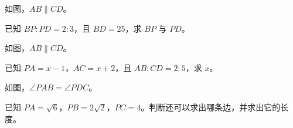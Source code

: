 \documentclass{exam-zh}
\begin{document}

\begin{problem}[points=10]
  \noindent
  \begin{minipage}[t]{\dimexpr\linewidth-60mm-6mm\relax}
    \vspace{0pt}
    如图，$AB\parallel CD$。

已知 $BP:PD=2:3$，且 $BD=25$，求 $BP$ 与 $PD$。
    
  \end{minipage}\hfill
  \begin{diagramcoltikz}{60mm}{}
  }
  \end{diagramcoltikz}
  \par\medskip
  \answerarea[48mm]
\end{problem}



\begin{problem}[points=10]
  \noindent
  \begin{minipage}[t]{\dimexpr\linewidth-60mm-6mm\relax}
    \vspace{0pt}
    如图，$AB\parallel CD$。

已知 $PA=x-1$，$AC=x+2$，且 $AB:CD=2:5$，求 $x$。
    
  \end{minipage}\hfill
  \begin{diagramcoltikz}{60mm}{}
  }
  \end{diagramcoltikz}
  \par\medskip
  \answerarea[48mm]
\end{problem}



\begin{problem}[points=10]
  \noindent
  \begin{minipage}[t]{\dimexpr\linewidth-60mm-6mm\relax}
    \vspace{0pt}
    如图，$\angle PAB=\angle PDC$。

已知 $PA=\sqrt{6}$，$PB=2\sqrt{2}$，$PC=4$。判断还可以求出哪条边，并求出它的长度。
    
  \end{minipage}\hfill
  \begin{diagramcoltikz}{60mm}{}
  }
  \end{diagramcoltikz}
  \par\medskip
  \answerarea[54mm]
\end{problem}
\end{document}
